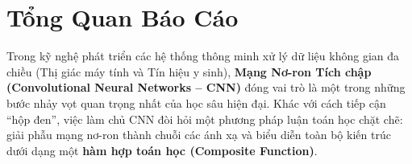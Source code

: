 \documentclass[12pt,a4paper]{report}
\begin{document}
\tableofcontents
\newpage
\listoffigures
\listoftables
\newpage
{}

\chapter*{Tổng Quan Báo Cáo}

Trong kỹ nghệ phát triển các hệ thống thông minh xử lý dữ liệu không gian đa chiều (Thị giác máy tính và Tín hiệu y sinh), \textbf{Mạng Nơ-ron Tích chập (Convolutional Neural Networks -- CNN)} đóng vai trò là một trong những bước nhảy vọt quan trọng nhất của học sâu hiện đại. Khác với cách tiếp cận ``hộp đen'', việc làm chủ CNN đòi hỏi một phương pháp luận toán học chặt chẽ: giải phẫu mạng nơ-ron thành chuỗi các ánh xạ và biểu diễn toàn bộ kiến trúc dưới dạng một \textbf{hàm hợp toán học (Composite Function)}.
\end{document}
